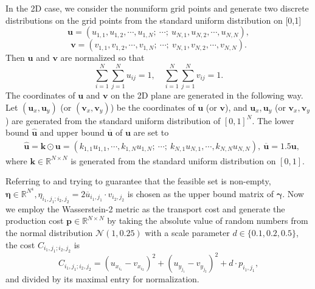 \documentclass[review,hidelinks,onefignum,onetabnum]{siamart220329}
\begin{document}
In the 2D case, we consider the nonuniform grid points and generate two discrete distributions on the grid points from the standard uniform distribution on [0,1] 
$$\bm{u}=(u_{1,1},u_{1,2},\cdots, u_{1,N};\ \cdots;\ u_{N,1},u_{N,2},\cdots,u_{N,N}),$$
$$\bm{v}=(v_{1,1},v_{1,2},\cdots, v_{1,N};\ \cdots;\ v_{N,1},v_{N,2},\cdots,v_{N,N}).$$
Then $\bm{u}$ and $\bm{v}$ are normalized so that 
$$\sum_{i=1}^{N}\sum_{j=1}^{N}u_{ij}=1,\quad \sum_{i=1}^{N}\sum_{j=1}^{N}v_{ij}=1.$$
The coordinates of $\bm{u}$ and $\bm{v}$ on the 2D plane are generated in the following way. Let $(\bm{u}_x,\bm{u}_y)$ (or $(\bm{v}_x,\bm{v}_y)$) be the coordinates of $\bm{u}$ (or $\bm{v}$), and $\bm{u}_x,\bm{u}_y$ (or $\bm{v}_x,\bm{v}_y$) are generated from the standard uniform distribution of $[0,1]^N$. 
The lower bound $\bm{\hat{u}}$ and upper bound $\bm{\overline{u}}$ of $\bm{u}$ are set to
\begin{align*}
    &\bm{\hat{u}}=\bm{k}\odot \bm{u} = \left(k_{1,1}u_{1,1},\cdots, k_{1,N} u_{1,N};\ \cdots;\ k_{N,1} u_{N,1},\cdots,k_{N,N} u_{N,N}\right),\
    \bm{\overline{u}}= 1.5 \bm{u},
\end{align*}
where $\bm{k}\in \mathbb{R}^{N\times N}$ is generated from the standard uniform distribution on $[0,1]$. 


Referring to \cite{wu2022double} and trying to guarantee that
the feasible set is non-empty, $\bm{\eta} \in \mathbb{R}^{N^4}, \eta_{i_1,j_1;i_2,j_2} = 2 \overline{u}_{i_1,j_1} \cdot v_{i_2,j_2} $ is chosen as the upper bound matrix of $\bm{\gamma}$.
Now we employ the Wasserstein-2 metric as the transport cost and generate the production cost $\bm{p}\in \mathbb{R}^{N\times N}$ by taking the absolute value of random numbers from the normal distribution $\mathcal{N}(1,0.25)$ with a scale parameter $d\in\{0.1,0.2,0.5\}$, the cost $C_{i_1,j_1;i_2,j_2}$ is
$$C_{i_1,j_1;i_2,j_2}=(u_{x_{i_1}}-v_{x_{i_2}})^2+ (u_{y_{j_1}}-v_{y_{j_2}})^2+d \cdot p_{i_1,j_1},$$
and divided by its maximal entry for normalization.
\end{document}
